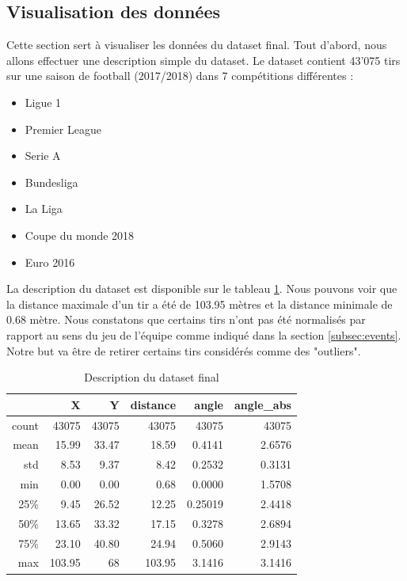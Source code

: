 \documentclass[12pt]{article}
\begin{document}
\subsection{Visualisation des données}
Cette section sert à visualiser les données du dataset final.
Tout d'abord, nous allons effectuer une description simple du dataset.
Le dataset contient 43'075 tirs sur une saison de football (2017/2018) dans 7 compétitions différentes :
\begin{itemize}
    \item Ligue 1
    \item Premier League
    \item Serie A
    \item Bundesliga
    \item La Liga
    \item Coupe du monde 2018
    \item Euro 2016
\end{itemize}
La description du dataset est disponible sur le tableau \ref{tab:describe_dataset}.
Nous pouvons voir que la distance maximale d'un tir a été de 103.95 mètres et la distance minimale de 0.68 mètre.
Nous constatons que certains tirs n'ont pas été normalisés par rapport au sens du jeu de l'équipe comme indiqué dans la section \ref{subsec:events}. 
Notre but va être de retirer certains tirs considérés comme des "outliers".
\begin{table}[htp]
    \centering
    \begin{tabular}{r|r|r|r|r|r|}
        \cline{2-6}
        \textbf{}                   & \textbf{X}   & \textbf{Y}   & \textbf{distance} & \textbf{angle} & \textbf{angle\_abs} \\ \hline
        \multicolumn{1}{|r|}{count} & 43075 & 43075 & 43075      & 43075   & 43075        \\ \hline
        \multicolumn{1}{|r|}{mean}  & 15.99    & 33.47    & 18.59         & 0.4141       & 2.6576            \\ \hline
        \multicolumn{1}{|r|}{std}   & 8.53     & 9.37     & 8.42          & 0.2532       & 0.3131            \\ \hline
        \multicolumn{1}{|r|}{min}   & 0.00     & 0.00     & 0.68          & 0.0000       & 1.5708            \\ \hline
        \multicolumn{1}{|r|}{25\%}  & 9.45     & 26.52    & 12.25         & 0.25019       & 2.4418            \\ \hline
        \multicolumn{1}{|r|}{50\%}  & 13.65    & 33.32    & 17.15         & 0.3278       & 2.6894            \\ \hline
        \multicolumn{1}{|r|}{75\%}  & 23.10   & 40.80    & 24.94         & 0.5060       & 2.9143            \\ \hline
        \multicolumn{1}{|r|}{max}   & 103.95   & 68    & 103.95        & 3.1416       & 3.1416            \\ \hline
        \end{tabular}
    \caption{Description du dataset final}
    \label{tab:describe_dataset}
\end{table}
\end{document}
